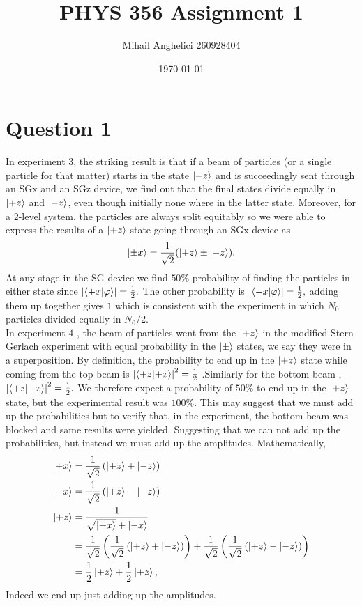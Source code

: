 \documentclass[
	12pt,
	]{article}
\title{PHYS 356 Assignment 1}
\author{Mihail Anghelici 260928404 }
\date{\today}
\theoremstyle{definition}
\theoremstyle{definition}
\theoremstyle{definition}
\theoremstyle{definition}
\theoremstyle{definition}
\theoremstyle{example}
\theoremstyle{note}
\theoremstyle{remark}
\theoremstyle{example}
\begin{document}
	\maketitle
		\section*{Question 1}
			In experiment $3$, the striking result is that if a beam of particles (or a single particle for that matter) starts in the state $\ket{+z}$ and is succeedingly sent through an SGx and an SGz device, we find out that the final states divide equally in $\ket{+z}$ and $\ket{-z}$, even though initially none where in the latter state. Moreover, for a 2-level system, the particles are always split equitably so we were able to express the results of a $\ket{+z}$ state going through an SGx device as 
			$$ \ket{\pm x} = \frac{1}{\sqrt{2}} (\ket{+z} \pm \ket{-z}).$$
			At any stage in the SG device we find $50 \%$ probability of finding the particles in either state since $\abs{\braket{+x}{\varphi}} = \frac12.$ The other probability is $\abs{\braket{-x}{\varphi}} = \frac12, $ adding them up together gives $1$ which is consistent with the experiment in which $N_{0}$ particles divided equally in $N_{0}/2$. \\
			
			
			\noindent In experiment $4$ , the beam of particles went from the $\ket{+z}$ in the modified Stern-Gerlach experiment with equal probability in the $\ket{\pm}$ states, we say they were in a superposition. By definition, the probability to end up in the $\ket{+z}$ state while coming from the top beam is $\abs{\braket{+z}{+x}}^{2} = \frac12$ .Similarly for the bottom beam , $\abs{\braket{+z}{-x}}^{2} = \frac12.$ We therefore expect a probability of $50 \%$ to end up in the $\ket{+z}$ state, but the experimental result was $100 \%$. This may suggest that we must add up the probabilities but to verify that, in the experiment, the bottom beam was blocked and same results were yielded. Suggesting that we can not add up the probabilities, but instead we must add up the amplitudes. Mathematically, 
			\begin{align*}
				\ket{+x} &= \frac{1}{\sqrt{2}}\left(\ket{+z} + \ket{-z}\right) \\
				\ket{-x} &= \frac{1}{\sqrt{2}}\left(\ket{+z} - \ket{-z}\right) \\
				\ket{+z} &= \frac{1}{\sqrt{\ket{+x}} + \ket{-x}} \\
				&= \frac{1}{\sqrt{2}}\left(\frac{1}{\sqrt{2}}\left(\ket{+z} + \ket{-z}\right)\right) + \frac{1}{\sqrt{2}} \left(\frac{1}{\sqrt{2}}\left(\ket{+z} - \ket{-z}\right)\right) \\
				&= \frac12 \ket{+z} + \frac12 \ket{+z}, 
			\end{align*}
			Indeed we end up just adding up the amplitudes.
\end{document}
